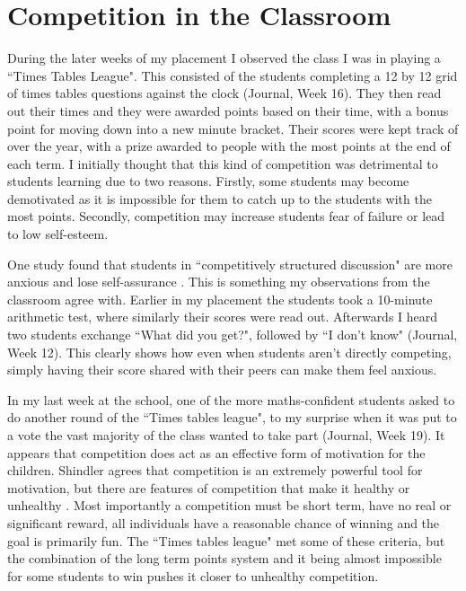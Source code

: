 \documentclass[11pt, a4paper, notitlepage]{article}
\begin{document}
\section*{Competition in the Classroom}
During the later weeks of my placement I observed the class I was in playing a ``Times Tables League". This consisted of the students completing a 12 by 12 grid of times tables questions against the clock (Journal, Week 16). They then read out their times and they were awarded points based on their time, with a bonus point for moving down into a new minute bracket. Their scores were kept track of over the year, with a prize awarded to people with the most points at the end of each term. I initially thought that this kind of competition was  detrimental to students learning due to two reasons. Firstly, some students may become demotivated as it is impossible for them to catch up to the students with the most points. Secondly, competition may increase students fear of failure or lead to low self-esteem. 
\par
One study found that students in ``competitively structured discussion" are more anxious and lose self-assurance \cite{Roger:1973}. This is something my observations from the classroom agree with. Earlier in my placement the students took a 10-minute arithmetic test, where similarly their scores were read out. Afterwards I heard two students exchange ``What did you get?", followed by ``I don't know" (Journal, Week 12). This clearly shows how even when students aren't directly competing, simply having their score shared with their peers can make them feel anxious. 
\par
In my last week at the school, one of the more maths-confident students asked to do another round of the ``Times tables league", to my surprise when it was put to a vote the vast majority of the class wanted to take part (Journal, Week 19). It appears that competition does act as an effective form of motivation for the children. Shindler agrees that competition is an extremely powerful tool for motivation, but there are features of competition that make it healthy or unhealthy \cite{Shindler:2009}. Most importantly a competition must be short term, have no real or significant reward, all individuals have a reasonable chance of winning and the goal is primarily fun. The ``Times tables league" met some of these criteria, but the combination of the long term points system and it being almost impossible for some students to win pushes it closer to unhealthy competition. 
\par
\end{document}
